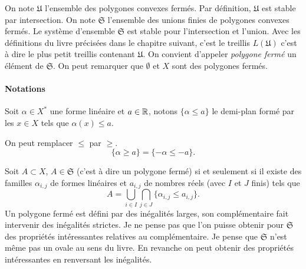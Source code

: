 On  note $\mathfrak U$ l'ensemble des polygones convexes fermés. Par définition, $\mathfrak{U}$ est stable par intersection. On note $\mathfrak{S}$ l'ensemble des unions finies de polygones convexes fermés. Le système d'ensemble $\mathfrak{S}$ est stable pour l'intersection et l'union. Avec les définitions du livre précisées dans le chapitre suivant, c'est le treillis $L(\mathfrak U)$ c'est à dire le plus petit treillis contenant $\mathfrak{U}$.\newline
On convient d'appeler \emph{polygone fermé} un élément de $\mathfrak{S}$. On peut remarquer que $\emptyset$ et $X$ sont des polygones fermés.

\paragraph{Notations}
\label{sec:notpolygones}
Soit $\alpha \in X^*$ une forme linéaire et $a\in \mathbb{R}$, notons $\{ \alpha \leq a\}$ le demi-plan formé par les $x \in X$ tels que $\alpha(x) \leq a$.


\begin{rem} On peut remplacer $\leq$ par $\geq$.
 \begin{displaymath}
   \{ \alpha \geq a \} = \{ -\alpha \leq -a \}.
 \end{displaymath}
\end{rem}

Soit $A\subset X$, $A \in \mathfrak{S}$ (c'est à dire un polygone fermé) si et seulement si il existe des familles $\alpha_{i,j}$ de formes linéaires et $a_{i,j}$ de nombres réels (avec $I$ et $J$ finis) tels que
\begin{displaymath}
 A = \bigcup_{i \in I} \bigcap_{j \in J}\{ \alpha_{i,j} \leq a_{i,j}\}.
\end{displaymath}
Un polygone fermé est défini par des inégalités larges, son complémentaire fait intervenir des inégalités strictes. Je ne pense pas que l'on puisse obtenir pour $\mathfrak{S}$ des propriétés intéressantes relatives au complémentaire. Je pense que $\mathfrak{S}$ n'est même pas un ovale au sens du livre.\newline
En revanche on peut obtenir des propriétés intéressantes en renversant les inégalités.

